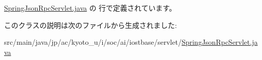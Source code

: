  \hyperlink{_spring_json_rpc_servlet_8java_source}{Spring\-Json\-Rpc\-Servlet.\-java} の  行で定義されています。



このクラスの説明は次のファイルから生成されました\-:\begin{DoxyCompactItemize}
\item 
src/main/java/jp/ac/kyoto\-\_\-u/i/soc/ai/iostbase/servlet/\hyperlink{_spring_json_rpc_servlet_8java}{Spring\-Json\-Rpc\-Servlet.\-java}\end{DoxyCompactItemize}
